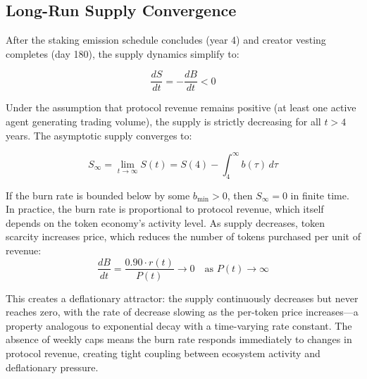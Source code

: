 \subsection{Long-Run Supply Convergence}
\label{subsec:long-run}

After the staking emission schedule concludes (year 4) and creator vesting
completes (day 180), the supply dynamics simplify to:

\begin{equation}
  \frac{dS}{dt} = -\frac{dB}{dt} < 0
  \label{eq:long-run}
\end{equation}

Under the assumption that protocol revenue remains positive (at least one
active agent generating trading volume), the supply is strictly decreasing for
all $t > 4$ years. The asymptotic supply converges to:

\begin{equation}
  S_\infty = \lim_{t \to \infty} S(t) = S(4) - \int_4^\infty b(\tau) \, d\tau
  \label{eq:s-infinity}
\end{equation}

If the burn rate is bounded below by some $b_{\min} > 0$, then $S_\infty = 0$
in finite time. In practice, the burn rate is proportional to protocol revenue,
which itself depends on the token economy's activity level. As supply
decreases, token scarcity increases price, which reduces the number of tokens
purchased per unit of revenue:
\begin{equation}
  \frac{dB}{dt} = \frac{0.90 \cdot r(t)}{P(t)} \to 0
  \quad \text{as } P(t) \to \infty
  \label{eq:equilibrium-supply}
\end{equation}

This creates a deflationary attractor: the supply continuously decreases but
never reaches zero, with the rate of decrease slowing as the per-token price
increases---a property analogous to exponential decay with a time-varying rate
constant. The absence of weekly caps means the burn rate responds immediately
to changes in protocol revenue, creating tight coupling between ecosystem
activity and deflationary pressure.

